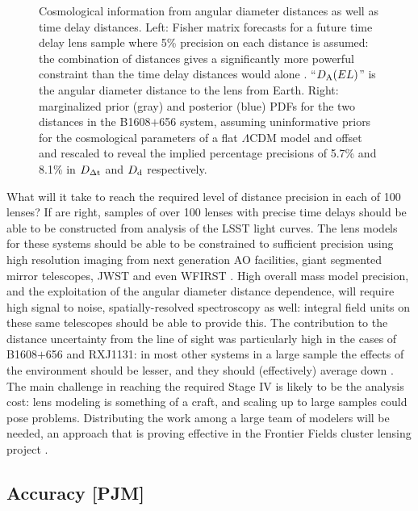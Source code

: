 \begin{figure}[!t]
\begin{minipage}{0.48\linewidth}
\end{minipage}
\caption{Cosmological information from angular diameter distances
as well as time delay distances. Left: Fisher matrix
forecasts for a future time delay lens sample where 5\% precision on
each distance is assumed: the combination of distances gives a
significantly more powerful constraint than the time delay distances
would alone \citep[reproduced from][]{JeeEtal2016}. ``$D_{\rm A}(EL)$'' is
the angular diameter distance to the lens from Earth. Right: marginalized
prior (gray) and posterior (blue) PDFs for the two
distances in the B1608$+$656 system, assuming uninformative priors for the
cosmological parameters of a flat $\Lambda$CDM model and offset and
rescaled to reveal the implied percentage precisions of 5.7\% and 8.1\%
in $D_{\Delta{\rm t}}$ and $D_{\rm d}$ respectively. }
\label{fig:DdDdt}
\end{figure}


What will it take to reach the required level of
distance precision in each of 100 lenses?
If \citet{LiaoEtal2015} are right, samples of over 100 lenses with
precise time delays should be able to be constructed from analysis of
the LSST light curves. The lens models for these systems should be able
to be constrained to sufficient precision using high resolution imaging
from next generation AO facilities, giant segmented mirror telescopes,
JWST and even WFIRST \citep{Men++15}. High overall mass model precision,
and the exploitation of the angular diameter distance dependence,
will require high signal to noise, spatially-resolved spectroscopy as
well: integral field units on
these same telescopes should be able to provide this. The contribution
to the distance uncertainty from the line of sight was particularly high
in the  cases of B1608$+$656 and RXJ1131: in most other systems in a large
sample the effects of the environment should be lesser, and they should
(effectively) average down \citep{Col++13}. The main challenge in
reaching the required Stage IV is likely to be the analysis cost: lens
modeling is something of a craft, and scaling up to large samples could
pose problems. Distributing the work among a large team of modelers will
be needed, an approach that is proving effective in the Frontier Fields
cluster lensing project \citep{FF}.




\subsection{Accuracy [PJM]}
\label{ssec:accuracy}

